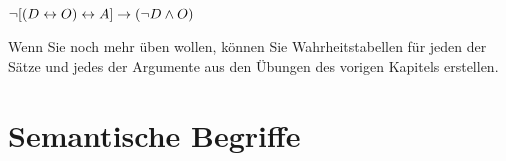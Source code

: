 \begin{earg}
%	


\item	$\neg [(D \leftrightarrow O) \leftrightarrow A] \rightarrow (\neg D \wedge O) $

\end{earg}

Wenn Sie noch mehr üben wollen, können Sie Wahrheitstabellen für jeden der Sätze und jedes der Argumente aus den Übungen des vorigen Kapitels erstellen.

\chapter{Semantische Begriffe}
\label{s:SemanticConcepts}

